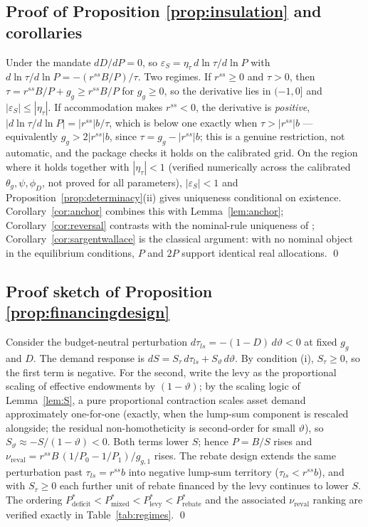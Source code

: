 \documentclass[12pt]{article}
\newcommand{\Sfun}{S}
\begin{document}
\subsection{Proof of Proposition \ref{prop:insulation} and corollaries}
Under the mandate $dD/dP=0$, so
$\varepsilon_S=\eta_\tau\,d\ln\tau/d\ln P$ with
$d\ln\tau/d\ln P=-(r^{ss}B/P)/\tau$. Two regimes. If $r^{ss}\ge0$ and
$\tau>0$, then $\tau=r^{ss}B/P+g_g\ge r^{ss}B/P$ for $g_g\ge0$, so the
derivative lies in $(-1,0]$ and $|\varepsilon_S|\le|\eta_\tau|$. If
accommodation makes $r^{ss}<0$, the derivative is \emph{positive},
$|d\ln\tau/d\ln P|=|r^{ss}|b/\tau$, which is below one exactly when
$\tau>|r^{ss}|b$ --- equivalently $g_g>2|r^{ss}|b$, since
$\tau=g_g-|r^{ss}|b$; this is a genuine restriction, not automatic, and the
package checks it holds on the calibrated grid. On the region where it
holds together with $|\eta_\tau|<1$ (verified numerically across the
calibrated $\theta_g,\psi,\phi_D$, not proved for all parameters),
$|\varepsilon_S|<1$ and Proposition~\ref{prop:determinacy}(ii) gives
uniqueness conditional on existence. Corollary~\ref{cor:anchor} combines
this with
Lemma~\ref{lem:anchor}; Corollary~\ref{cor:reversal} contrasts with the
nominal-rule uniqueness of \citet{hagedorn2026dtpl};
Corollary~\ref{cor:sargentwallace} is the classical argument: with no nominal
object in the equilibrium conditions, $P$ and $2P$ support identical real
allocations. \qed

\subsection{Proof sketch of Proposition \ref{prop:financingdesign}}
Consider the budget-neutral perturbation $d\tau_{ls} = -(1-D)\,d\vartheta <
0$ at fixed $g_g$ and $D$. The demand response is
$d\Sfun = \Sfun_{\tau}\, d\tau_{ls} + \Sfun_{\vartheta}\, d\vartheta$. By
condition (i), $\Sfun_{\tau} \ge 0$, so the first term is negative. For the
second, write the levy as the proportional scaling of effective endowments
by $(1-\vartheta)$; by the scaling logic of Lemma~\ref{lem:S}, a pure
proportional contraction scales asset demand approximately one-for-one
(exactly, when the lump-sum component is rescaled alongside; the residual
non-homotheticity is second-order for small $\vartheta$), so
$\Sfun_{\vartheta} \approx -\Sfun/(1-\vartheta) < 0$. Both terms lower
$\Sfun$; hence $P = B/\Sfun$ rises and
$\nu_{\mathrm{reval}} = r^{ss}B\,(1/P_0 - 1/P_1)/g_{g,1}$ rises. The rebate
design extends the same perturbation past $\tau_{ls} = r^{ss}b$ into
negative lump-sum territory ($\tau_{ls} < r^{ss}b$), and with
$\Sfun_{\tau} \ge 0$ each further unit of rebate financed by the levy
continues to lower $\Sfun$. The ordering
$P^{*}_{\text{deficit}} < P^{*}_{\text{mixed}} < P^{*}_{\text{levy}} <
P^{*}_{\text{rebate}}$ and the associated $\nu_{\mathrm{reval}}$ ranking are
verified exactly in Table~\ref{tab:regimes}. \qed
\end{document}
